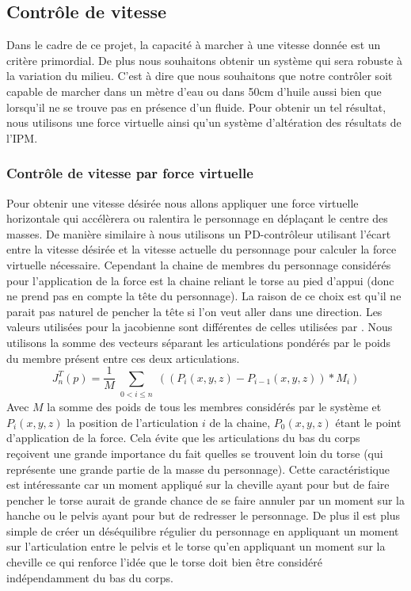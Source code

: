 \documentclass[runningheads,a4paper]{llncs}
\begin{document}
%
\subsection{Contrôle de vitesse}
%
\label{sec:speed_control}
Dans le cadre de ce projet, la capacité à marcher à une vitesse donnée est un critère primordial. De plus nous souhaitons obtenir un système qui sera robuste à la variation du milieu. C'est à dire que nous souhaitons que notre contrôler soit capable de marcher dans un mètre d'eau ou dans 50cm d'huile aussi bien que lorsqu'il ne se trouve pas en présence d'un fluide. Pour obtenir un tel résultat, nous utilisons une force virtuelle ainsi qu'un système d'altération des résultats de l'IPM.
%
\subsubsection{Contrôle de vitesse par force virtuelle}
%
\label{sec:speed_virt_force}

Pour obtenir une vitesse désirée nous allons appliquer une force virtuelle horizontale qui accélèrera ou ralentira le personnage en déplaçant le centre des masses. De manière similaire à \cite{coros2010generalized} nous utilisons un PD-contrôleur utilisant l'écart entre la vitesse désirée et la vitesse actuelle du personnage pour calculer la force virtuelle nécessaire.
Cependant la chaine de membres du personnage considérés pour l'application de la force est la chaine reliant le torse au pied d'appui (donc ne prend pas en compte la tête du personnage). La raison de ce choix est qu'il ne parait pas naturel de pencher la tête si l'on veut aller dans une direction. Les valeurs utilisées pour la jacobienne sont différentes de celles utilisées par \cite{coros2010generalized}. Nous utilisons la somme des vecteurs séparant les articulations pondérés par le poids du membre présent entre ces deux articulations.
\[
J_n ^T (p)=\frac{1}{M}\sum_{\substack{0<i\leq n}} ((P_i(x,y,z)-P_{i-1}(x,y,z))*M_i)
\]
Avec \(M\) la somme des poids de tous les membres considérés par le système et \(P_i(x,y,z)\) la position de l'articulation \(i\) de la chaine, \(P_0(x,y,z)\) étant le point d'application de la force. Cela évite que les articulations du bas du corps reçoivent une grande importance du fait quelles se trouvent loin du torse (qui représente une grande partie de la masse du personnage). Cette caractéristique est intéressante car un moment appliqué sur la cheville ayant pour but de faire pencher le torse aurait de grande chance de se faire annuler par un moment sur la hanche ou le pelvis ayant pour but de redresser le personnage. De plus il est plus simple de créer un déséquilibre régulier du personnage en appliquant un moment sur l'articulation entre le pelvis et le torse qu'en appliquant un moment sur la cheville ce qui renforce l'idée que le torse doit bien être considéré indépendamment du bas du corps.
\end{document}
